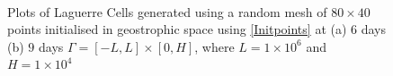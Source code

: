 \begin{figure}[h!]
	\centering
	\\
	\caption{Plots of Laguerre Cells generated using a random mesh of $80 \times 40$ points initialised in geostrophic space using \ref{Initpoints} at (a) $6$ days (b) $9$ days $\Gamma = [-L,L]\times[0,H]$, where $L = 1\times10^6$ and $H = 1\times10^4$}
	\label{lagcells2}
\end{figure}
\newpage
